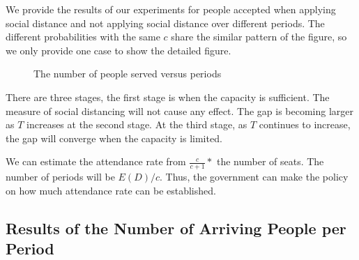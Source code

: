 We provide the results of our experiments for people accepted when applying social distance and not applying social distance over different periods. The different probabilities with the same $c$ share the similar pattern of the figure, so we only provide one case to show the detailed figure.


\begin{figure}[h]
  \centering
  \caption{The number of people served versus periods}
  \label{Fig.lable}
\end{figure}


There are three stages, the first stage is when the capacity is sufficient. The measure of social distancing will not cause any effect. The gap is becoming larger as $T$ increases at the second stage. At the third stage, as $T$ continues to increase, the gap will converge when the capacity is limited.

We can estimate the attendance rate from $\frac{c}{c+1}*$ the number of seats. The number of periods will be $E(D)/c$. Thus, the government can make the policy on how much attendance rate can be established.


\subsection{Results of the Number of Arriving People per Period}

